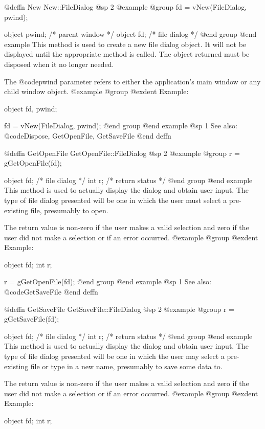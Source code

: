 @deffn {New} New::FileDialog
@sp 2
@example
@group
fd = vNew(FileDialog, pwind);

object  pwind;  /*  parent window  */
object  fd;     /*  file dialog    */
@end group
@end example
This method is used to create a new file dialog object.  It will not be
displayed until the appropriate method is called.  The object returned
must be disposed when it no longer needed.

The @code{pwind} parameter refers to either the application's main window
or any child window object.
@example
@group
@exdent Example:

object  fd, pwind;

fd = vNew(FileDialog, pwind);
@end group
@end example
@sp 1
See also:  @code{Dispose, GetOpenFile, GetSaveFile}
@end deffn





@deffn {GetOpenFile} GetOpenFile::FileDialog
@sp 2
@example
@group
r = gGetOpenFile(fd);

object  fd;     /*  file dialog    */
int     r;      /*  return status  */
@end group
@end example
This method is used to actually display the dialog and obtain user input.
The type of file dialog presented will be one in which the user must
select a pre-existing file, presumably to open.

The return value is non-zero if the user makes a valid selection and
zero if the user did not make a selection or if an error occurred.
@example
@group
@exdent Example:

object  fd;
int     r;

r = gGetOpenFile(fd);
@end group
@end example
@sp 1
See also:  @code{GetSaveFile}
@end deffn






@deffn {GetSaveFile} GetSaveFile::FileDialog
@sp 2
@example
@group
r = gGetSaveFile(fd);

object  fd;     /*  file dialog    */
int     r;      /*  return status  */
@end group
@end example
This method is used to actually display the dialog and obtain user input.
The type of file dialog presented will be one in which the user may
select a pre-existing file or type in a new name, presumably to save some
data to.

The return value is non-zero if the user makes a valid selection and
zero if the user did not make a selection or if an error occurred.
@example
@group
@exdent Example:

object  fd;
int     r;

